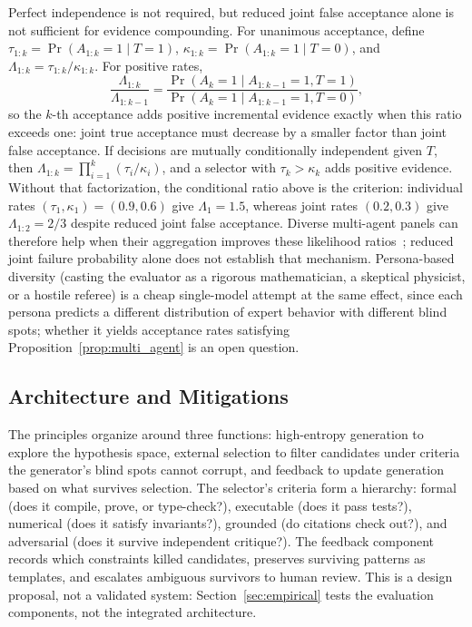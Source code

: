 \documentclass[a4paper,journal]{IAENGtran}
\begin{document}
Perfect independence is not required, but reduced joint false acceptance alone is not
sufficient for evidence compounding. For unanimous acceptance, define
$\tau_{1:k}=\Pr(A_{1:k}=1\mid T=1)$, $\kappa_{1:k}=\Pr(A_{1:k}=1\mid T=0)$, and
$\Lambda_{1:k}=\tau_{1:k}/\kappa_{1:k}$. For positive rates,
\begin{equation}
\frac{\Lambda_{1:k}}{\Lambda_{1:k-1}}=
\frac{\Pr(A_k=1\mid A_{1:k-1}=1,T=1)}
{\Pr(A_k=1\mid A_{1:k-1}=1,T=0)},
\end{equation}
so the $k$-th acceptance adds positive incremental evidence exactly when this ratio
exceeds one: joint true acceptance must decrease by a smaller factor than joint false
acceptance. If decisions are mutually conditionally independent given $T$, then
$\Lambda_{1:k}=\prod_{i=1}^k(\tau_i/\kappa_i)$, and a selector with $\tau_k>\kappa_k$
adds positive evidence. Without that factorization, the conditional ratio above is the
criterion: individual rates $(\tau_1,\kappa_1)=(0.9,0.6)$ give $\Lambda_1=1.5$, whereas
joint rates $(0.2,0.3)$ give $\Lambda_{1:2}=2/3$ despite reduced joint false
acceptance. Diverse multi-agent panels can therefore help when their aggregation
improves these likelihood ratios~\cite{du2023debate, liang2023debate}; reduced joint
failure probability alone does not establish that mechanism. Persona-based
diversity (casting the evaluator as a rigorous mathematician, a skeptical physicist,
or a hostile referee) is a cheap single-model attempt at the same effect, since each
persona predicts a different distribution of expert behavior with different blind
spots; whether it yields acceptance rates satisfying
Proposition~\ref{prop:multi_agent} is an open question.

\subsection{Architecture and Mitigations}

The principles organize around three functions: high-entropy generation to explore the
hypothesis space, external selection to filter candidates under criteria the
generator's blind spots cannot corrupt, and feedback to update generation based on what
survives selection. The selector's criteria form a hierarchy: formal (does it compile,
prove, or type-check?), executable (does it pass tests?), numerical (does it satisfy
invariants?), grounded (do citations check out?), and adversarial (does it survive
independent critique?). The feedback component records which constraints killed
candidates, preserves surviving patterns as templates, and escalates ambiguous
survivors to human review. This is a design proposal, not a validated system:
Section~\ref{sec:empirical} tests the evaluation components, not the integrated
architecture.
\end{document}
